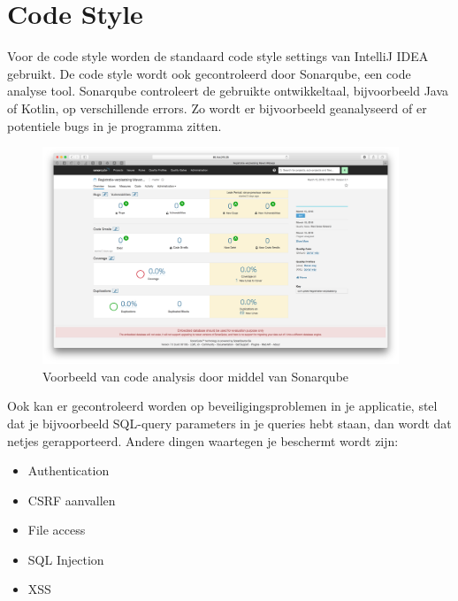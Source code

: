\chapter{Code Style}
Voor de code style worden de standaard code style settings van IntelliJ IDEA gebruikt.
De code style wordt ook gecontroleerd door Sonarqube, een code analyse tool.
Sonarqube controleert de gebruikte ontwikkeltaal, bijvoorbeeld Java of Kotlin, op verschillende errors. Zo wordt er bijvoorbeeld geanalyseerd of er potentiele bugs in je programma zitten.

\begin{figure}[H]
	\centering
	\includegraphics[width=0.95\textwidth]{images/StaticCodeAnalysis.png}
	\caption{Voorbeeld van code analysis door middel van Sonarqube}
	\label{fig:StaticCodeAnalyses}
\end{figure}

Ook kan er gecontroleerd worden op beveiligingsproblemen in je applicatie, stel dat je bijvoorbeeld SQL-query parameters in je queries hebt staan, dan wordt dat netjes gerapporteerd.
Andere dingen waartegen je beschermt wordt zijn:
\begin{itemize}
	\setlength\itemsep{0em}
	\item Authentication
	\item CSRF aanvallen
	\item File access
	\item SQL Injection
	\item XSS
\end{itemize}

